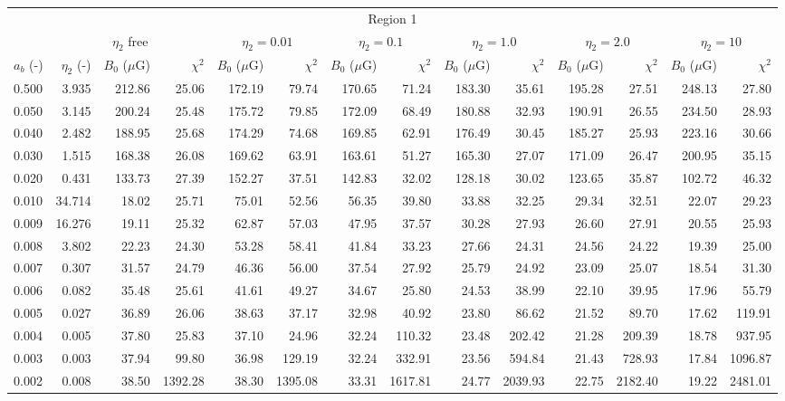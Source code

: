 \begin{tabular}{@{}lrrrrrrrrrrrrr@{}}
\toprule
\multicolumn{14}{c}{Region 1} \\
\cmidrule{1-14}
{} & \multicolumn{3}{c}{$\eta_2$ free} & \multicolumn{2}{c}{$\eta_2 = 0.01$}
   & \multicolumn{2}{c}{$\eta_2 = 0.1$} & \multicolumn{2}{c}{$\eta_2 = 1.0$}
   & \multicolumn{2}{c}{$\eta_2 = 2.0$} & \multicolumn{2}{c}{$\eta_2 = 10$} \\
\cmidrule(lr){2-4} \cmidrule(lr){5-6} \cmidrule(lr){7-8} \cmidrule(lr){9-10}
    \cmidrule(lr){11-12} \cmidrule(lr){13-14}
$a_b$ (-) & $\eta_2$ (-) & $B_0$ ($\mu$G) & $\chi^2$
& $B_0$ ($\mu$G) & $\chi^2$ & $B_0$ ($\mu$G) & $\chi^2$
& $B_0$ ($\mu$G) & $\chi^2$ & $B_0$ ($\mu$G) & $\chi^2$
& $B_0$ ($\mu$G) & $\chi^2$ \\
\cmidrule{1-14}
0.500 & 3.935 & 212.86 & 25.06 & 172.19 & 79.74 & 170.65 & 71.24 & 183.30 & 35.61 & 195.28 & 27.51 & 248.13 & 27.80 \\
0.050 & 3.145 & 200.24 & 25.48 & 175.72 & 79.85 & 172.09 & 68.49 & 180.88 & 32.93 & 190.91 & 26.55 & 234.50 & 28.93 \\
0.040 & 2.482 & 188.95 & 25.68 & 174.29 & 74.68 & 169.85 & 62.91 & 176.49 & 30.45 & 185.27 & 25.93 & 223.16 & 30.66 \\
0.030 & 1.515 & 168.38 & 26.08 & 169.62 & 63.91 & 163.61 & 51.27 & 165.30 & 27.07 & 171.09 & 26.47 & 200.95 & 35.15 \\
0.020 & 0.431 & 133.73 & 27.39 & 152.27 & 37.51 & 142.83 & 32.02 & 128.18 & 30.02 & 123.65 & 35.87 & 102.72 & 46.32 \\
0.010 & 34.714 & 18.02 & 25.71 & 75.01 & 52.56 & 56.35 & 39.80 & 33.88 & 32.25 & 29.34 & 32.51 & 22.07 & 29.23 \\
0.009 & 16.276 & 19.11 & 25.32 & 62.87 & 57.03 & 47.95 & 37.57 & 30.28 & 27.93 & 26.60 & 27.91 & 20.55 & 25.93 \\
0.008 & 3.802 & 22.23 & 24.30 & 53.28 & 58.41 & 41.84 & 33.23 & 27.66 & 24.31 & 24.56 & 24.22 & 19.39 & 25.00 \\
0.007 & 0.307 & 31.57 & 24.79 & 46.36 & 56.00 & 37.54 & 27.92 & 25.79 & 24.92 & 23.09 & 25.07 & 18.54 & 31.30 \\
0.006 & 0.082 & 35.48 & 25.61 & 41.61 & 49.27 & 34.67 & 25.80 & 24.53 & 38.99 & 22.10 & 39.95 & 17.96 & 55.79 \\
0.005 & 0.027 & 36.89 & 26.06 & 38.63 & 37.17 & 32.98 & 40.92 & 23.80 & 86.62 & 21.52 & 89.70 & 17.62 & 119.91 \\
0.004 & 0.005 & 37.80 & 25.83 & 37.10 & 24.96 & 32.24 & 110.32 & 23.48 & 202.42 & 21.28 & 209.39 & 18.78 & 937.95 \\
0.003 & 0.003 & 37.94 & 99.80 & 36.98 & 129.19 & 32.24 & 332.91 & 23.56 & 594.84 & 21.43 & 728.93 & 17.84 & 1096.87 \\
0.002 & 0.008 & 38.50 & 1392.28 & 38.30 & 1395.08 & 33.31 & 1617.81 & 24.77 & 2039.93 & 22.75 & 2182.40 & 19.22 & 2481.01 \\


\end{tabular}

